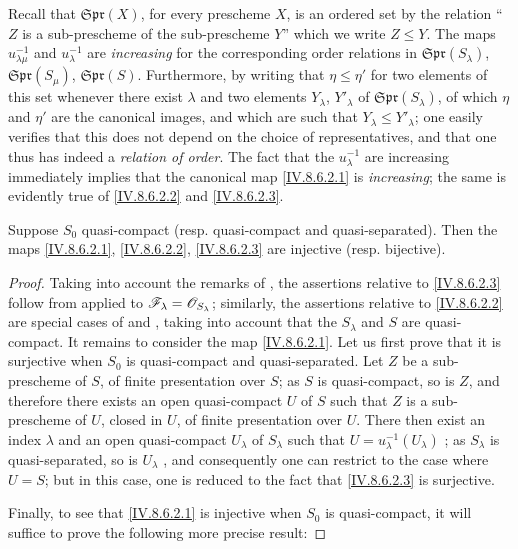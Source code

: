 
Recall  that $\mathfrak{Spr}(X)$, for every prescheme $X$, is an ordered set by the relation ``$Z$ is a sub-prescheme of the sub-prescheme $Y$'' which we write $Z\leqslant Y$.
The maps $u_{\lambda\mu}^{-1}$ and $u_\lambda^{-1}$ are \emph{increasing} for the corresponding order relations in $\mathfrak{Spr}(S_\lambda)$, $\mathfrak{Spr}(S_\mu)$, $\mathfrak{Spr}(S)$.
Furthermore, by writing that $\eta\leqslant\eta'$ for two elements of this set whenever there exist $\lambda$ and two elements $Y_\lambda$, $Y'_\lambda$ of $\mathfrak{Spr}(S_\lambda)$, of which $\eta$ and $\eta'$ are the canonical images, and which are such that $Y_\lambda\leqslant Y'_\lambda$; one easily verifies that this does not depend on the choice of representatives, and that one thus has indeed a \emph{relation of order}.
The fact that the $u_\lambda^{-1}$ are increasing immediately implies that the canonical map \eqref{IV.8.6.2.1} is \emph{increasing}; the same is evidently true of \eqref{IV.8.6.2.2} and \eqref{IV.8.6.2.3}.

\begin{proposition}[8.6.3]
\label{IV.8.6.3}
Suppose $S_0$ quasi-compact \textup{(resp.} quasi-compact and quasi-separated\textup{)}.
Then the maps \eqref{IV.8.6.2.1}, \eqref{IV.8.6.2.2}, \eqref{IV.8.6.2.3} are injective \textup{(resp.} bijective\textup{)}.
\end{proposition}

\begin{proof}
Taking into account the remarks of , the assertions relative to \eqref{IV.8.6.2.3} follow from  applied to $\mathscr{F}_\lambda=\mathscr{O}_{S_\lambda}$; similarly, the assertions relative to \eqref{IV.8.6.2.2} are special cases of  and , taking into account that the $S_\lambda$ and $S$ are quasi-compact.
It remains to consider the map \eqref{IV.8.6.2.1}.
Let us first prove that it is surjective when $S_0$ is quasi-compact and quasi-separated.
Let $Z$ be a sub-prescheme of $S$, of finite presentation over $S$; as $S$ is quasi-compact, so is $Z$, and therefore there exists an open quasi-compact $U$ of $S$ such that $Z$ is a sub-prescheme of $U$, closed in $U$, of finite presentation over $U$.
There then exist an index $\lambda$ and an open quasi-compact $U_\lambda$ of $S_\lambda$ such that $U=u_\lambda^{-1}(U_\lambda)$ ; as $S_\lambda$ is quasi-separated, so is $U_\lambda$ , and consequently one can restrict to the case where $U=S$; but in this case, one is reduced to the fact that \eqref{IV.8.6.2.3} is surjective.

Finally, to see that \eqref{IV.8.6.2.1} is injective when $S_0$ is quasi-compact, it will suffice to prove the following more precise result:
\end{proof}

